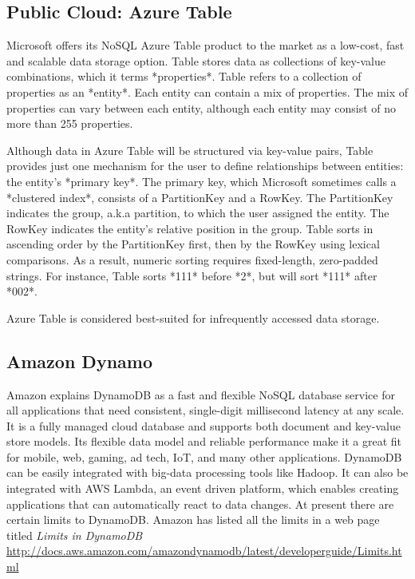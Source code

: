 \subsection{Public Cloud: Azure Table}

     Microsoft offers its NoSQL Azure Table product to the market as a
     low-cost, fast and scalable data storage
     option. \cite{www-what-to-use} Table stores data as collections
     of key-value combinations, which it terms *properties*.  Table
     refers to a collection of properties as an *entity*.  Each entity
     can contain a mix of properties.  The mix of properties can vary
     between each entity, although each entity may consist of no more
     than 255 properties. \cite{www-blobqueuetable}

     Although data in Azure Table will be structured via key-value
     pairs, Table provides just one mechanism for the user to define
     relationships between entities: the entity's *primary key*.  The
     primary key, which Microsoft sometimes calls a *clustered index*,
     consists of a PartitionKey and a RowKey.  The PartitionKey
     indicates the group, a.k.a partition, to which the user assigned
     the entity.  The RowKey indicates the entity's relative position
     in the group.  Table sorts in ascending order by the PartitionKey
     first, then by the RowKey using lexical comparisons.  As a
     result, numeric sorting requires fixed-length, zero-padded
     strings.  For instance, Table sorts *111* before *2*, but will
     sort *111* after *002*. \cite{www-scalable-partitioning}

     Azure Table is considered best-suited for infrequently accessed
     data storage.

\subsection{Amazon Dynamo}

     Amazon explains DynamoDB as \cite{www.dyndb} a fast and flexible 
     NoSQL database service for all applications that need consistent, 
     single-digit millisecond latency at any scale. It is a fully managed 
     cloud database and supports both document and key-value store models. 
     Its flexible data model and reliable performance make it a great fit 
     for mobile, web, gaming, ad tech, IoT, and many other applications. 
     DynamoDB can be easily integrated with big-data processing tools like 
     Hadoop. It can also be integrated with AWS Lambda, an event driven platform, 
     which enables creating applications that can automatically react to data 
     changes. At present there are certain limits to DynamoDB. Amazon has listed 
     all the limits in a web page titled {\em Limits in DynamoDB }
     \url{http://docs.aws.amazon.com/amazondynamodb/latest/developerguide/Limits.html}


